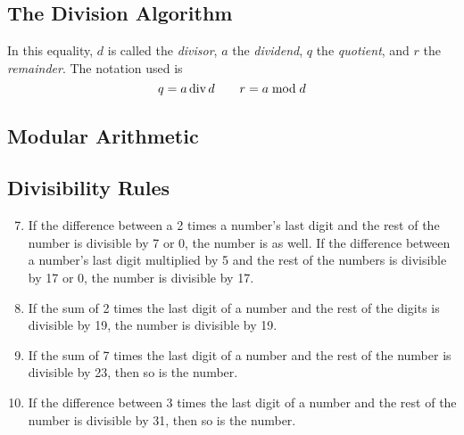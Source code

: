 \documentclass[./Discrete Math.tex]{subfiles}
\begin{document}
		\subsection{The Division Algorithm}
			In this equality, \(d\) is called the \textit{divisor}, \(a\) the \textit{dividend}, \(q\) the \textit{quotient}, and \(r\) the \textit{remainder}. The notation used is
				\[q = a \operatorname{div} d \qquad r = a \bmod d\]
		\subsection{Modular Arithmetic}
		\subsection*{Divisibility Rules}
			\begin{enumerate}
				\setcounter{enumi}{6}
				\item
					If the difference between a 2 times a number's last digit and the rest of the number is divisible by 7 or 0, the number is as well.
				\setcounter{enumi}{17}
					If the difference between a number's last digit multiplied by 5 and the rest of the numbers is divisible by 17 or 0, the number is divisible by 17.
				\setcounter{enumi}{18}
				\item
					If the sum of 2 times the last digit of a number and the rest of the digits is divisible by 19, the number is divisible by 19.
				\setcounter{enumi}{22}
				\item
					If the sum of 7 times the last digit of a number and the rest of the number is divisible by 23, then so is the number.
				\setcounter{enumi}{30}
				\item
					If the difference between 3 times the last digit of a number and the rest of the number is divisible by 31, then so is the number.
			\end{enumerate}
\end{document}
